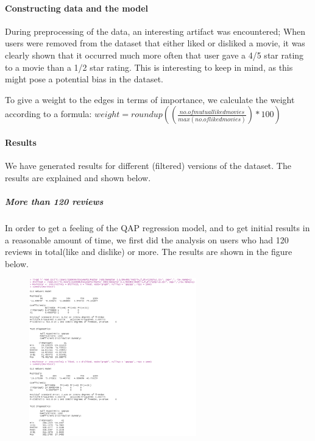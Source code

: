 \documentclass[
  english,
  man,floatsintext]{apa6}
\let\oldparagraph\paragraph
\renewcommand{\paragraph}[1]{\oldparagraph{#1}\mbox{}}
\let\oldsubparagraph\subparagraph
\renewcommand{\subparagraph}[1]{\oldsubparagraph{#1}\mbox{}}
\begin{document}
\hypertarget{constructing-data-and-the-model}{%
\paragraph{Constructing data and the model}\label{constructing-data-and-the-model}}

During preprocessing of the data, an interesting artifact was encountered; When users were removed from the dataset that either liked or disliked a movie, it was clearly shown that it occurred much more often that user gave a 4/5 star rating to a movie than a 1/2 star rating. This is interesting to keep in mind, as this might pose a potential bias in the dataset.

To give a weight to the edges in terms of importance, we calculate the weight according to a formula: \(weight = roundup((\frac{no. of mutual liked movies}{max(no. of liked movies)})*100)\)

\hypertarget{results-1}{%
\paragraph{Results}\label{results-1}}

We have generated results for different (filtered) versions of the dataset. The results are explained and shown below.

\hypertarget{more-than-120-reviews}{%
\subparagraph{More than 120 reviews}\label{more-than-120-reviews}}

In order to get a feeling of the QAP regression model, and to get initial results in a reasonable amount of time, we first did the analysis on users who had 120 reviews in total(like and dislike) or more. The results are shown in the figure below.

\begin{figure}
\includegraphics[width=2.85in]{results120plus} \caption{ }\label{fig:unnamed-chunk-7}
\end{figure}
\end{document}
